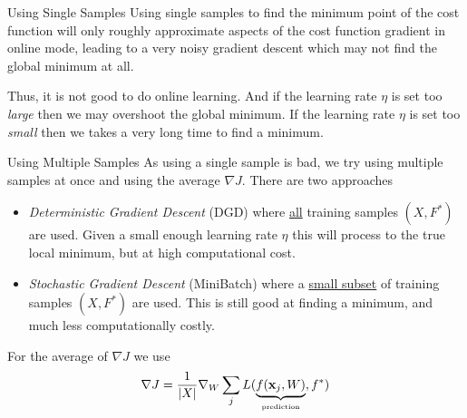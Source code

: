\documentclass[11pt,a4paper]{article}
\begin{document}
  \begin{remark}{Using Single Samples}
    Using single samples to find the minimum point of the cost function will only roughly approximate aspects of the cost function gradient in online mode, leading to a very noisy gradient descent which may not find the global minimum at all.
    \par Thus, it is not good to do online learning. And if the learning rate $\eta$ is set too \textit{large} then we may overshoot the global minimum. If the learning rate $\eta$ is set too \textit{small} then we takes a very long time to find a minimum.
  \end{remark}

  \begin{proposition}{Using Multiple Samples}
    As using a single sample is bad, we try using multiple samples at once and using the average $\nabla J$. There are two approaches
    \begin{itemize}
      \item \textit{Deterministic Gradient Descent} (DGD) where \underline{all} training samples $(X,F^*)$ are used. Given a small enough learning rate $\eta$ this will process to the true local minimum, but at high computational cost.
      \item \textit{Stochastic Gradient Descent} (MiniBatch) where a \underline{small subset} of training samples $(X,F^*)$ are used. This is still good at finding a minimum, and much less computationally costly.
    \end{itemize}
    For the average of $\nabla J$ we use
    \[ \nabla J=\frac1{|X|}\nabla_W\sum_j L(\underbrace{f(\mathbf{x}_j,W)}_\text{\tiny prediction},f^*) \]
  \end{proposition}
\end{document}
